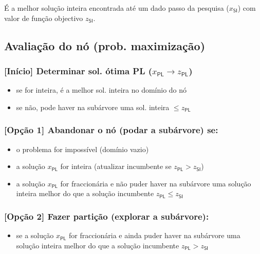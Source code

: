 \documentclass[10pt, a4paper]{article}
\begin{document}
\begin{multicols}{2}
É a melhor solução inteira encontrada até um dado passo da pesquisa (\(x_\textsf{SI}\)) com valor de função objectivo \(z_\textsf{SI}\).

\subsection{Avaliação do nó (prob. maximização)}

\subsubsection{[Início] Determinar sol. ótima PL (\(x_\textsf{PL} \rightarrow z_\textsf{PL}\))}

\begin{itemize}
    \item se for inteira, é a melhor sol. inteira no domínio do nó
    \item se não, pode haver na subárvore uma sol. inteira \(\le z_\textsf{PL}\)
\end{itemize}

\subsubsection{[Opção 1] Abandonar o nó (podar a subárvore) se:}

\begin{itemize}
    \item o problema for impossível (domínio vazio)
    \item a solução \(x_\textsf{PL}\) for inteira (atualizar incumbente se \(z_\textsf{PL} > z_\textsf{SI}\))
    \item a solução \(x_\textsf{PL}\) for fraccionária e não puder haver na subárvore uma solução inteira melhor do que a solução incumbente \(z_\textsf{PL} \le z_\textsf{SI}\)
\end{itemize}

\subsubsection{[Opção 2] Fazer partição (explorar a subárvore):}

\begin{itemize}
    \item se a solução \(x_\textsf{PL}\) for fraccionária e ainda puder haver na subárvore uma solução inteira melhor do que a solução incumbente \(z_\textsf{PL} > z_\textsf{SI}\)
\end{itemize}


\end{multicols}
\end{document}
